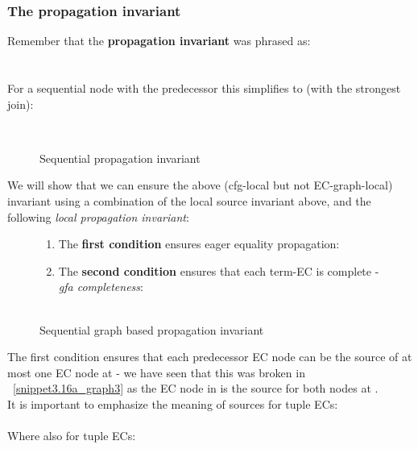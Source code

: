 \subsubsection{The propagation invariant}
Remember that the \textbf{propagation invariant} was phrased as:\\
 \\
\\
For a sequential node  with the predecessor  this simplifies to (with the strongest join):
\begin{figure}[H]
 \\
\caption{Sequential propagation invariant}
\end{figure}
We will show that we can ensure the above (cfg-local but not EC-graph-local) invariant using a combination of the local source invariant above, and the following \emph{local propagation invariant}:
\begin{figure}[H]
\begin{enumerate}
	\item The \textbf{first condition} ensures eager equality propagation:\\
	\item The \textbf{second condition} ensures that each term-EC is complete - \emph{gfa completeness}:\\
\\
\end{enumerate}
\caption{Sequential graph based propagation invariant}
\end{figure}
The first condition ensures that each predecessor EC node can be the source of at most one EC node at - 
we have seen that this was broken in ~\ref{snippet3.16a_graph3} as the EC node  in  
is the source for both nodes  at .\\
It is important to emphasize the meaning of sources for tuple ECs:\\
\\
Where also for tuple ECs:\\


